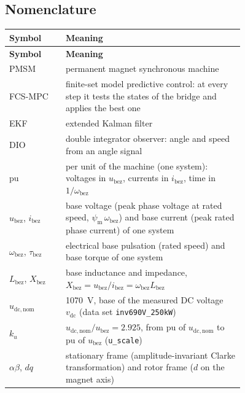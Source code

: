\documentclass[11pt,a4paper]{scrartcl}
\newcommand{\ped}[1]{_{\mathrm{#1}}}
\newcommand{\code}[1]{\texttt{#1}}
\begin{document}


\tableofcontents
\listoffigures
\listoftables
\newpage

\begin{onehalfspace}

\section*{Nomenclature}
\label{sec:nomenclature}

\begingroup
{}
\begin{longtable}{@{} l p{0.76\linewidth} @{}}
	\toprule
	\textbf{Symbol} & \textbf{Meaning} \\
	\midrule
	\endfirsthead
	\toprule
	\textbf{Symbol} & \textbf{Meaning} \\
	\midrule
	\endhead
	\bottomrule
	\endfoot
	\bottomrule
	\endlastfoot
	PMSM & permanent magnet synchronous machine \\
	FCS-MPC & finite-set model predictive control: at every step it tests the states of the bridge and applies the best one \\
	EKF & extended Kalman filter \\
	DIO & double integrator observer: angle and speed from an angle signal \\
	pu & per unit of the machine (one system): voltages in $u\ped{bez}$, currents in $i\ped{bez}$, time in $1/\omega\ped{bez}$ \\
	$u\ped{bez}$, $i\ped{bez}$ & base voltage (peak phase voltage at rated speed, $\psi\ped{m}\,\omega\ped{bez}$) and base current (peak rated phase current) of one system \\
	$\omega\ped{bez}$, $\tau\ped{bez}$ & electrical base pulsation (rated speed) and base torque of one system \\
	$L\ped{bez}$, $X\ped{bez}$ & base inductance and impedance, $X\ped{bez} = u\ped{bez}/i\ped{bez} = \omega\ped{bez}L\ped{bez}$ \\
	$u\ped{dc,nom}$ & \SI{1070}{\volt}, base of the measured DC voltage $v\ped{dc}$ (data set \code{inv690V\_250kW}) \\
	$k_u$ & $u\ped{dc,nom}/u\ped{bez} = 2.925$, from pu of $u\ped{dc,nom}$ to pu of $u\ped{bez}$ (\code{u\_scale}) \\
	$\alpha\beta$, $dq$ & stationary frame (amplitude-invariant Clarke transformation) and rotor frame ($d$ on the magnet axis) \\

\end{longtable}
\end{onehalfspace}
\end{document}
